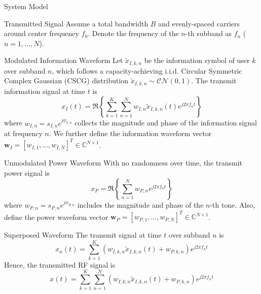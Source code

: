 \documentclass{IEEEtran}
\begin{document}
\begin{section}{System Model}
	\begin{subsection}{Transmitted Signal}
		Assume a total bandwidth $B$ and evenly-spaced carriers around center frequency $f_0$. Denote the frequency of the $n$-th subband as $f_n$ ($n=1,\dots,N$).
		\begin{subsubsection} {Modulated Information Waveform}
			Let $\tilde{x}_{I,k,n}$ be the information symbol of user $k$ over subband $n$, which follows a capacity-achieving i.i.d. Circular Symmetric Complex Gaussian (CSCG) distribution $\tilde{x}_{I,k,n}\sim\mathcal{CN}(0,1)$. The transmit information signal at time $t$ is
			\begin{equation}\label{eq:x_I}
				x_{I}(t)=\Re\left\{\sum_{k=1}^K\sum_{n=1}^N{w_{I,n}\tilde{x}_{I,k,n}(t)}{e^{j2{\pi}{f_n}{t}}}\right\}
			\end{equation}
			where $w_{I,n}=s_{I,n}e^{j\phi_{I,n}}$ collects the magnitude and phase of the information signal at frequency $n$. We further define the information waveform vector $\boldsymbol{w}_I=[w_{I,1},\dots,w_{I,N}]^T \in \mathbb{C}^{N{\times}1}$.
		\end{subsubsection}

		\begin{subsubsection}{Unmodulated Power Waveform}
			With no randomness over time, the transmit power signal is
			\begin{equation}\label{eq:x_P}
				x_{P}=\Re\left\{\sum_{n=1}^N{w_{P,n}}{e^{j2{\pi}{f_n}{t}}}\right\}
			\end{equation}
			where $w_{P,n}=s_{P,n}e^{j\phi_{P,n}}$ includes the magnitude and phase of the $n$-th tone. Also, define the power waveform vector $\boldsymbol{w}_P=[w_{P,1},\dots,w_{P,N}]^T \in \mathbb{C}^{N{\times}1}$.
		\end{subsubsection}

		\begin{subsubsection}{Superposed Waveform}
			The transmit signal at time $t$ over subband $n$ is
			\begin{equation}\label{eq:x_n(t)}
				x_n(t)=\sum_{k=1}^K{(w_{I,k,n}\tilde{x}_{I,k,n}(t)+w_{P,k,n}){e^{j2{\pi}{f_n}{t}}}}
			\end{equation}
			Hence, the transmitted RF signal is
			\begin{equation}\label{eq:x(t)}
				x(t)=\sum_{k=1}^K\sum_{n=1}^N{(w_{I,k,n}\tilde{x}_{I,k,n}(t)+w_{P,k,n}){e^{j2{\pi}{f_n}{t}}}}
			\end{equation}
		\end{subsubsection}
	\end{subsection}


\end{section}
\end{document}
